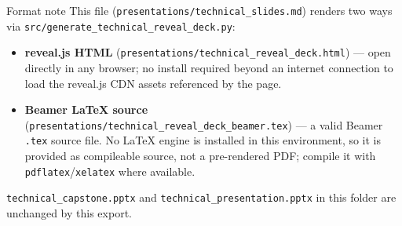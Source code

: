 \documentclass[
  ignorenonframetext,
]{beamer}
\providecommand{\tightlist}{%
  \setlength{\itemsep}{0pt}\setlength{\parskip}{0pt}}
\begin{document}
\begin{frame}[fragile]
\begin{block}{Format note}
\protect{}\label{format-note}
This file (\texttt{presentations/technical\_slides.md}) renders two ways
via \texttt{src/generate\_technical\_reveal\_deck.py}:

\begin{itemize}
\tightlist
\item
  \textbf{reveal.js HTML}
  (\texttt{presentations/technical\_reveal\_deck.html}) --- open
  directly in any browser; no install required beyond an internet
  connection to load the reveal.js CDN assets referenced by the page.
\item
  \textbf{Beamer LaTeX source}
  (\texttt{presentations/technical\_reveal\_deck\_beamer.tex}) --- a
  valid Beamer \texttt{.tex} source file. No LaTeX engine is installed
  in this environment, so it is provided as compileable source, not a
  pre-rendered PDF; compile it with \texttt{pdflatex}/\texttt{xelatex}
  where available.
\end{itemize}

\texttt{technical\_capstone.pptx} and
\texttt{technical\_presentation.pptx} in this folder are unchanged by
this export.
\end{block}
\end{frame}
\end{document}
